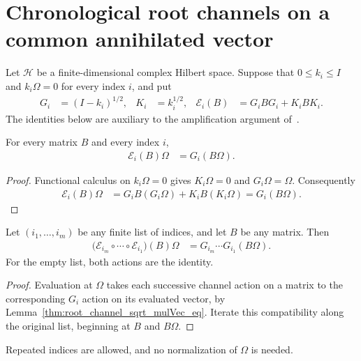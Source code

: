 \section{Chronological root channels on a common annihilated vector}
\label{sec:root_channel_word}

Let $\mathcal H$ be a finite-dimensional complex Hilbert space. Suppose that
$0\le k_i\le I$ and $k_i\Omega=0$ for every index $i$, and put
\begin{align}
  G_i&=(I-k_i)^{1/2}, & K_i&=k_i^{1/2}, &
  \mathcal E_i(B)&=G_iBG_i+K_iBK_i.
\end{align}
The identities below are auxiliary to the amplification argument
of~\cite{OpenAI2026AreaLaw}.

\begin{lemma}
  \label{thm:root_channel_sqrt_mulVec_eq}
  \leanok
  For every matrix $B$ and every index $i$,
  \begin{align}
    \mathcal E_i(B)\Omega&=G_i(B\Omega).
  \end{align}
\end{lemma}

\begin{proof}
  \leanok
  Functional calculus on $k_i\Omega=0$ gives $K_i\Omega=0$ and
  $G_i\Omega=\Omega$. Consequently
  \begin{align}
    \mathcal E_i(B)\Omega
      &=G_iB(G_i\Omega)+K_iB(K_i\Omega)=G_i(B\Omega).
  \end{align}
\end{proof}

\begin{theorem}
  \label{thm:root_channel_foldl_mulVec_eq}
  \leanok
  Let $(i_1,\ldots,i_m)$ be any finite list of indices, and let $B$ be any matrix.
  Then
  \begin{align}
    \bigl(\mathcal E_{i_m}\circ\cdots\circ\mathcal E_{i_1}\bigr)(B)\Omega
      &=G_{i_m}\cdots G_{i_1}(B\Omega).
  \end{align}
  For the empty list, both actions are the identity.
\end{theorem}

\begin{proof}
  \leanok
  Evaluation at $\Omega$ takes each successive channel action on a matrix
  to the corresponding $G_i$ action on its evaluated vector, by
  Lemma~\ref{thm:root_channel_sqrt_mulVec_eq}. Iterate this compatibility
  along the original list, beginning at $B$ and $B\Omega$.
\end{proof}

Repeated indices are allowed, and no normalization of $\Omega$ is needed.
